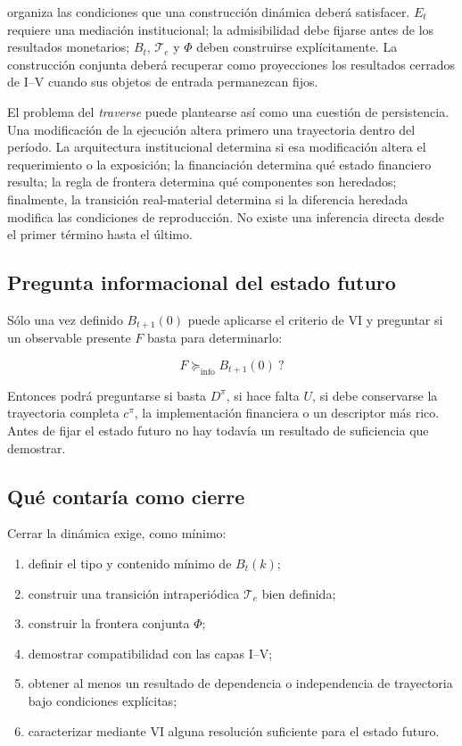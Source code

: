 \documentclass[10pt,a5paper,twoside]{article}
\providecommand{\tightlist}{\setlength{\itemsep}{0pt}\setlength{\parskip}{0pt}}
\begin{document}
organiza las condiciones que una construcción dinámica deberá satisfacer.
\(E_t\) requiere una mediación institucional; la admisibilidad debe fijarse
antes de los resultados monetarios; \(B_t\), \(\mathcal T_e\) y \(\Phi\) deben
construirse explícitamente. La construcción conjunta deberá recuperar como
proyecciones los resultados cerrados de I--V cuando sus objetos de entrada
permanezcan fijos.

El problema del \emph{traverse} puede plantearse así como una cuestión de
persistencia. Una modificación de la ejecución altera primero una trayectoria
dentro del período. La arquitectura institucional determina si esa modificación
altera el requerimiento o la exposición; la financiación determina qué estado
financiero resulta; la regla de frontera determina qué componentes son
heredados; finalmente, la transición real-material determina si la diferencia
heredada modifica las condiciones de reproducción. No existe una inferencia
directa desde el primer término hasta el último.

\subsection{Pregunta informacional del estado futuro}\label{pregunta-informacional-del-estado-futuro}

Sólo una vez definido \(B_{t+1}(0)\) puede aplicarse el criterio de VI y
preguntar si un observable presente \(F\) basta para determinarlo:

\[
F\succeq_{\mathrm{info}}B_{t+1}(0)\ ?
\]

Entonces podrá preguntarse si basta \(D^\pi\), si hace falta \(U\), si debe
conservarse la trayectoria completa \(c^\pi\), la implementación financiera
o un descriptor más rico. Antes de fijar el estado futuro no hay todavía
un resultado de suficiencia que demostrar.

\subsection{Qué contaría como cierre}\label{quuxe9-contaruxeda-como-cierre}

Cerrar la dinámica exige, como mínimo:

\begin{enumerate}
\def\labelenumi{\arabic{enumi}.}
\tightlist
\item
  definir el tipo y contenido mínimo de \(B_t(k)\);
\item
  construir una transición intraperiódica \(\mathcal T_e\) bien
  definida;
\item
  construir la frontera conjunta \(\Phi\);
\item
  demostrar compatibilidad con las capas I--V;
\item
  obtener al menos un resultado de dependencia o independencia de
  trayectoria bajo condiciones explícitas;
\item
  caracterizar mediante VI alguna resolución suficiente para el estado
  futuro.
\end{enumerate}
\end{document}
